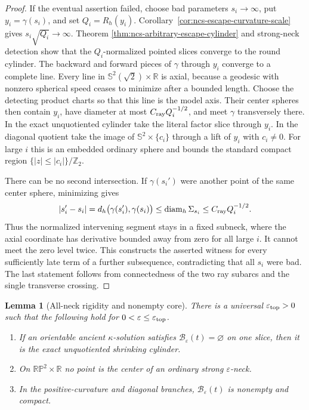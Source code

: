 \documentclass[10pt]{coll-l}
\newcommand{\R}{\mathbb{R}}
\newcommand{\Sph}{\mathbb{S}}
\newtheorem{lemma}[theorem]{Lemma}
\theoremstyle{definition}
\theoremstyle{remark}
\numberwithin{section}{chapter}
\numberwithin{equation}{chapter}
\begin{document}
\begin{proof}
If the eventual assertion failed, choose bad parameters $s_i\to\infty$,
put $y_i=\gamma(s_i)$, and set
$Q_i=R_h(y_i)$.  Corollary~\ref{cor:ncs-escape-curvature-scale} gives
$s_i\sqrt{Q_i}\to\infty$.  Theorem
\ref{thm:ncs-arbitrary-escape-cylinder} and strong-neck detection show
that the $Q_i$-normalized pointed slices converge to the round cylinder.
The backward and forward pieces of $\gamma$ through $y_i$ converge to a
complete line.  Every line in $\Sph^2(\sqrt2)\times\mathbb R$ is axial,
because a geodesic with nonzero spherical speed ceases to minimize after
a bounded length.  Choose the detecting product charts so that this line
is the model axis.  Their center spheres then contain $y_i$, have diameter
at most $C_{\rm ray}Q_i^{-1/2}$, and meet $\gamma$ transversely there.
In the exact unquotiented cylinder take the literal factor slice through
$y_i$.  In the diagonal quotient take the image of
$\Sph^2\times\{c_i\}$ through a lift of $y_i$ with $c_i\neq0$.  For large
$i$ this is an embedded ordinary sphere and bounds the standard compact
region $\{|z|\leq|c_i|\}/\mathbb Z_2$.

There can be no second intersection.  If $\gamma(s_i')$ were another
point of the same center sphere, minimizing gives
\begin{equation}
 |s_i'-s_i|=d_h\bigl(\gamma(s_i'),\gamma(s_i)\bigr)
       \leq\operatorname{diam}_h\Sigma_{s_i}
       \leq C_{\rm ray}Q_i^{-1/2}.                   \label{eq:ncs-ray-sphere-no-reentry-bound}
\end{equation}
Thus the normalized intervening segment stays in a fixed subneck, where
the axial coordinate has derivative bounded away from zero for all large
$i$.  It cannot meet the zero level twice.  This constructs the asserted
witness for every sufficiently late term of a further subsequence,
contradicting that all $s_i$ were bad.  The last statement follows from
connectedness of the two ray subarcs and the single transverse crossing.
\end{proof}

\begin{lemma}[All-neck rigidity and nonempty core]
\label{lem:ncs-all-neck-rigidity}
There is a universal $\varepsilon_{\rm top}>0$ such that the following
hold for $0<\varepsilon\leq\varepsilon_{\rm top}$.
\begin{enumerate}
\item If an orientable ancient $\kappa$-solution satisfies
      $\mathscr B_\varepsilon(t)=\varnothing$ on one slice, then it is the
      exact unquotiented shrinking cylinder.
\item On $\mathbb{RP}^2\times\R$ no point is the center of an ordinary
      strong $\varepsilon$-neck.
\item In the positive-curvature and diagonal branches,
      $\mathscr B_\varepsilon(t)$ is nonempty and compact.
\end{enumerate}
\end{lemma}
\end{document}
